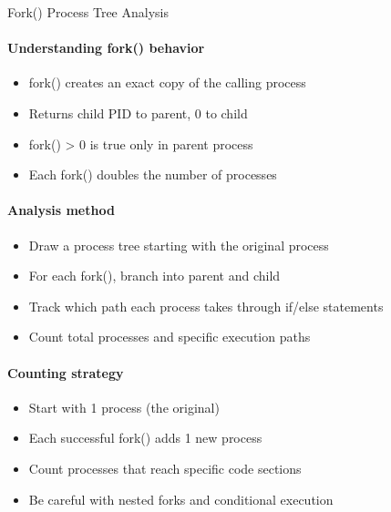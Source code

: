 \begin{KR}{Fork() Process Tree Analysis}
    \paragraph{Understanding fork() behavior}
    \begin{itemize}
        \item fork() creates an exact copy of the calling process
        \item Returns child PID to parent, 0 to child
        \item fork() > 0 is true only in parent process
        \item Each fork() doubles the number of processes
    \end{itemize}
    
    \paragraph{Analysis method}
    \begin{itemize}
        \item Draw a process tree starting with the original process
        \item For each fork(), branch into parent and child
        \item Track which path each process takes through if/else statements
        \item Count total processes and specific execution paths
    \end{itemize}
    
    \paragraph{Counting strategy}
    \begin{itemize}
        \item Start with 1 process (the original)
        \item Each successful fork() adds 1 new process
        \item Count processes that reach specific code sections
        \item Be careful with nested forks and conditional execution
    \end{itemize}
\end{KR}

